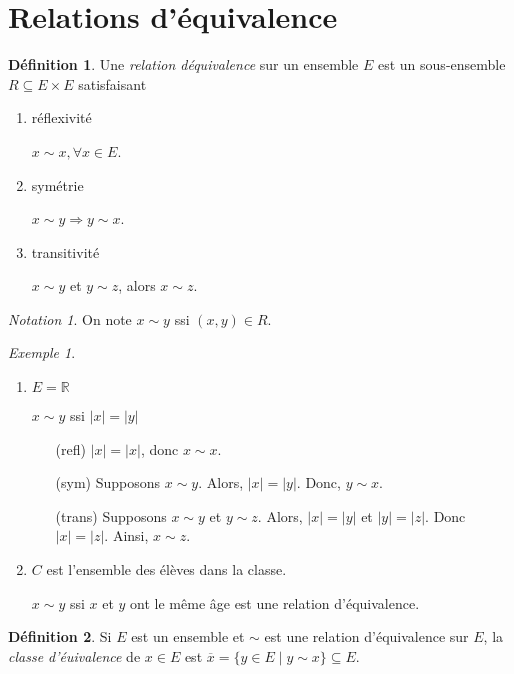 \documentclass{report}
\newcommand*{\abs}[1]{\left| #1 \right|}
\newcommand*{\reels}{\mathbb{R}}
\theoremstyle{definition}
\newtheorem*{defin}{D\'efinition}
\theoremstyle{remark}
\newtheorem*{exem}{Exemple}
\newtheorem*{nota}{Notation}
\begin{document}
	\section{Relations d'\'equivalence}
	\begin{defin}
		Une \emph{relation d\'equivalence} sur un ensemble $E$ est un sous-ensemble $R \subseteq E \times E$ satisfaisant
		\begin{enumerate}
			\item r\'eflexivit\'e

			$x \sim x, \forall x \in E$.
			\item sym\'etrie

			$x \sim y \Rightarrow y \sim x$.
			\item transitivit\'e

			$x \sim y$ et $y \sim z$, alors $x \sim z$.
		\end{enumerate}
		\begin{nota}
			On note $x \sim y$ ssi $(x,y) \in R$.
		\end{nota}
	\end{defin}
	\begin{exem}~

		\begin{enumerate}[label=(\alph*)]
			\item $E = \reels$

			$x \sim y$ ssi $\abs{x} = \abs{y}$
			\begin{itemize}
				\item[(refl)] $\abs{x} = \abs{x}$, donc $x \sim x$.
				\item[(sym)] Supposons $x \sim y$. Alors, $\abs{x} = \abs{y}$. Donc, $y \sim x$.
				\item[(trans)] Supposons $x \sim y$ et $y \sim z$. Alors, $\abs{x} = \abs{y}$ et $\abs{y} = \abs{z}$. Donc $\abs{x} = \abs{z}$. Ainsi, $x \sim z$.
			\end{itemize}
			\item $C$ est l'ensemble des \'el\`eves dans la classe.

			$x \sim y$ ssi $x$ et $y$ ont le m\^eme \^age est une relation d'\'equivalence.
		\end{enumerate}
	\end{exem}
	\begin{defin}
		Si $E$ est un ensemble et $\sim$ est une relation d'\'equivalence sur $E$, la \emph{classe d'\'euivalence} de $x \in E$ est $\overline{x} = \{y \in E \mid y \sim x\} \subseteq E$.
	\end{defin}
\end{document}
